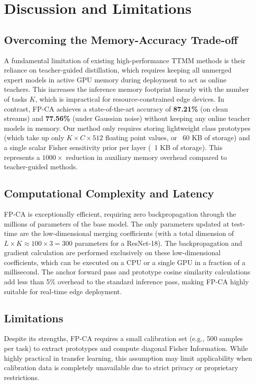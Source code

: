 \documentclass{article}
\theoremstyle{plain}
\theoremstyle{definition}
\theoremstyle{remark}
\begin{document}
\section{Discussion and Limitations}
\label{discussion}

\subsection{Overcoming the Memory-Accuracy Trade-off}
A fundamental limitation of existing high-performance TTMM methods is their reliance on teacher-guided distillation, which requires keeping all unmerged expert models in active GPU memory during deployment to act as online teachers. This increases the inference memory footprint linearly with the number of tasks $K$, which is impractical for resource-constrained edge devices. In contrast, FP-CA achieves a state-of-the-art accuracy of \textbf{87.21\%} (on clean streams) and \textbf{77.56\%} (under Gaussian noise) without keeping any online teacher models in memory. Our method only requires storing lightweight class prototypes (which take up only $K \times C \times 512$ floating point values, or ~60 KB of storage) and a single scalar Fisher sensitivity prior per layer (~1 KB of storage). This represents a $1000\times$ reduction in auxiliary memory overhead compared to teacher-guided methods.

\subsection{Computational Complexity and Latency}
FP-CA is exceptionally efficient, requiring zero backpropagation through the millions of parameters of the base model. The only parameters updated at test-time are the low-dimensional merging coefficients (with a total dimension of $L \times K \approx 100 \times 3 = 300$ parameters for a ResNet-18). The backpropagation and gradient calculation are performed exclusively on these low-dimensional coefficients, which can be executed on a CPU or a single GPU in a fraction of a millisecond. The anchor forward pass and prototype cosine similarity calculations add less than 5\% overhead to the standard inference pass, making FP-CA highly suitable for real-time edge deployment.

\subsection{Limitations}
Despite its strengths, FP-CA requires a small calibration set (e.g., 500 samples per task) to extract prototypes and compute diagonal Fisher Information. While highly practical in transfer learning, this assumption may limit applicability when calibration data is completely unavailable due to strict privacy or proprietary restrictions.
\end{document}
